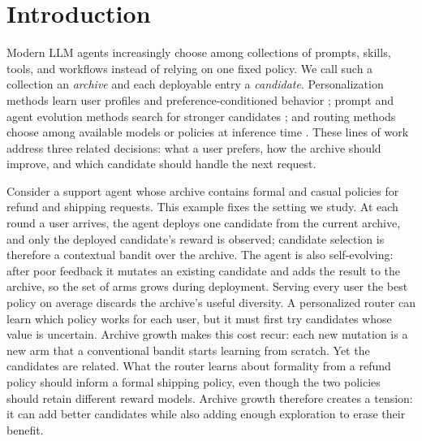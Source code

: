 \documentclass{article} %
\begin{document}
\begin{abstract}
Building on this base, we introduce \emph{Hyper-Ridge PersonalEvo}, which replaces independent isotropic regularization with a shared archive geometry. For known geometry, we prove a pathwise exploration bound with an explicit confidence radius and an effective-dimension potential term. We also prove finite-sample covariance control for a calibration-split variant that estimates the geometry from fresh candidates and freezes it before routing. With fixed problem constants, its explicit calibration charge and width-inflation remainder are $o(\sqrt{T})$, while its full exploration bound is $O(\sqrt{T}\log T)$. Neither theorem covers the periodically re-estimated router. In diagnostics, the true geometry lowers cumulative exploration cost by $46$--$59\%$, whereas periodic re-estimation raises it by $7$--$19\%$.
\end{abstract}

\section{Introduction}

\label{sec:intro}

Modern LLM agents increasingly choose among collections of prompts, skills, tools, and workflows instead of relying on one fixed policy. We call such a collection an \emph{archive} and each deployable entry a \emph{candidate}. Personalization methods learn user profiles and preference-conditioned behavior \citep{salemi2023lamp,zhao2025prefeval,jin2026personalizing}; prompt and agent evolution methods search for stronger candidates \citep{fernando2023promptbreeder,guo2024evoprompt,zhou2024symbolic,agrawal2025geparp}; and routing methods choose among available models or policies at inference time \citep{ong2024routellm,hu2024routerbench,li2025llmbandit,tsai2026neuralucb}. These lines of work address three related decisions: what a user prefers, how the archive should improve, and which candidate should handle the next request.

Consider a support agent whose archive contains formal and casual policies for refund and shipping requests. This example fixes the setting we study. At each round a user arrives, the agent deploys one candidate from the current archive, and only the deployed candidate's reward is observed; candidate selection is therefore a contextual bandit over the archive. The agent is also self-evolving: after poor feedback it mutates an existing candidate and adds the result to the archive, so the set of arms grows during deployment. Serving every user the best policy on average discards the archive's useful diversity. A personalized router can learn which policy works for each user, but it must first try candidates whose value is uncertain. Archive growth makes this cost recur: each new mutation is a new arm that a conventional bandit starts learning from scratch. Yet the candidates are related. What the router learns about formality from a refund policy should inform a formal shipping policy, even though the two policies should retain different reward models. Archive growth therefore creates a tension: it can add better candidates while also adding enough exploration to erase their benefit.
\end{document}
